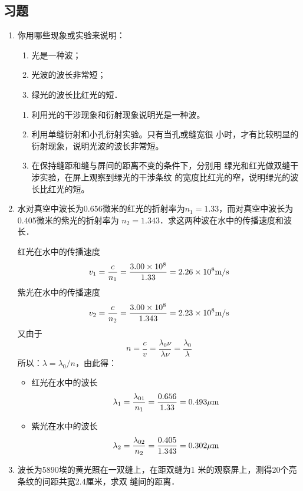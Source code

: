 \subsection{习题}

\begin{enumerate}
    \item 你用哪些现象或实验来说明：
    \begin{enumerate}
        \item 光是一种波；
        \item 光波的波长非常短；
        \item 绿光的波长比红光的短．
    \end{enumerate}


    \begin{solution}
\begin{enumerate}
    \item 利用光的干涉现象和衍射现象说明光是一种波。
    \item 利用单缝衍射和小孔衍射实验。只有当孔或缝宽很
    小时，才有比较明显的衍射现象，说明光波的波长非常短。
    \item 在保持缝距和缝与屏间的距离不变的条件下，分别用
    绿光和红光做双缝干涉实验，在屏上观察到绿光的干涉条纹
    的宽度比红光的窄，说明绿光的波长比红光的短。
\end{enumerate} 
    \end{solution}
    
    \item 水对真空中波长为0.656微米的红光的折射率为$n_1
    =1.33$，而对真空中波长为0.405微米的紫光的折射率为
    $n_2=1.343$．求这两种波在水中的传播速度和波长．


    \begin{solution}
红光在水中的传播速度
\[v_1=\frac{c}{n_1}=\frac{3.00\times10^8}{1.33}=2.26\times10^8\text{m}/\text{s}\]
紫光在水中的传播速度
\[v_2=\frac{c}{n_2}=\frac{3.00\times10^8}{1.343}=2.23\times10^8\text{m}/\text{s}\]
又由于
\[n=\frac{c}{v}=\frac{\lambda_0 \nu}{\lambda\nu}=\frac{\lambda_0}{\lambda}\]
所以：$\lambda=\lambda_0/n$，由此得：
\begin{itemize}
    \item 红光在水中的波长
\[\lambda_1=\frac{\lambda_{01}}{n_1}=\frac{0.656}{1.33}=0.493\mu{\rm m}\]
    \item     紫光在水中的波长
\[\lambda_2=\frac{\lambda_{02}}{n_2}=\frac{0.405}{1.343}=0.302\mu{\rm m}\]
\end{itemize}

    \end{solution}
    
    \item 波长为5890埃的黄光照在一双缝上，在距双缝为1
    米的观察屏上，测得20个亮条纹的间距共宽2.4厘米，求双
    缝间的距离．



\end{enumerate}
